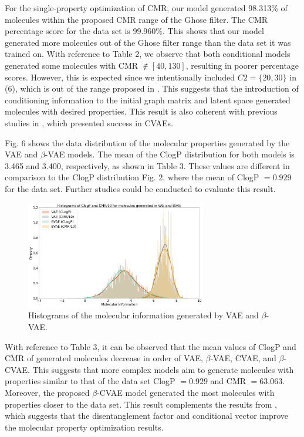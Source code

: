 For the single-property optimization of CMR, our model generated 98.313\% of molecules within the proposed CMR range of the Ghose filter. The CMR percentage score for the data set is 99.960\%. This shows that our model generated more molecules out of the Ghose filter range than the data set it was trained on. With reference to Table 2, we observe that both conditional models generated some molecules with CMR $\notin [40, 130]$, resulting in poorer percentage scores. However, this is expected since we intentionally included $C2 = \{20, 30\}$ in (6), which is out of the range proposed in \cite{ghose1999knowledge}. This suggests that the introduction of conditioning information to the initial graph matrix and latent space generated molecules with desired properties. This result is also coherent with previous studies in \cite{meyers2021novo, li2018multi, lim2018molecular, richards2022conditional}, which presented success in CVAEs. 

Fig. 6 shows the data distribution of the molecular properties generated by the VAE and $\beta$-VAE models. The mean of the ClogP distribution for both models is 3.465 and 3.400, respectively, as shown in Table 3. These values are different in comparison to the ClogP distribution Fig. 2, where the mean of ClogP $= 0.929$ for the data set. Further studies could be conducted to evaluate this result.

\begin{figure}[htbp]
    \centerline{\includegraphics[width=0.7\textwidth]{fig6.png}}
    \caption{Histograms of the molecular information generated by VAE and $\beta$-VAE.}
    \label{fig}
\end{figure}

With reference to Table 3, it can be observed that the mean values of ClogP and CMR of generated molecules decrease in order of VAE, $\beta$-VAE, CVAE, and $\beta$-CVAE. This suggests that more complex models aim to generate molecules with properties similar to that of the data set ClogP $= 0.929$ and CMR $= 63.063$. Moreover, the proposed $\beta$-CVAE model generated the most molecules with properties closer to the data set. This result complements the results from \cite{meyers2021novo, richards2022conditional}, which suggests that the disentanglement factor and conditional vector improve the molecular property optimization results. 

